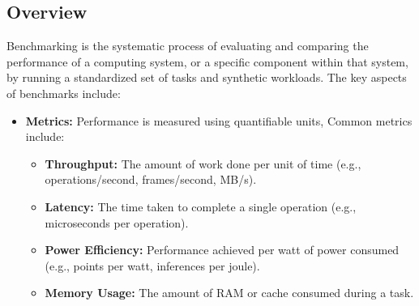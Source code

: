 \subsection{Overview}
Benchmarking is the systematic process of evaluating and comparing the performance of a computing system, or a specific component within that system, by running a standardized set of tasks and synthetic workloads.
The key aspects of benchmarks include:
\begin{itemize}
    \item \textbf{Metrics:} Performance is measured using quantifiable units, Common metrics include:
        \begin{itemize}
            \item \textbf{Throughput:} The amount of work done per unit of time (e.g., operations/second, frames/second, MB/s).
            \item \textbf{Latency:} The time taken to complete a single operation (e.g., microseconds per operation).
            \item \textbf{Power Efficiency:} Performance achieved per watt of power consumed (e.g., points per watt, inferences per joule).
            \item \textbf{Memory Usage:} The amount of RAM or cache consumed during a task.
            \end{itemize}
\end{itemize}
